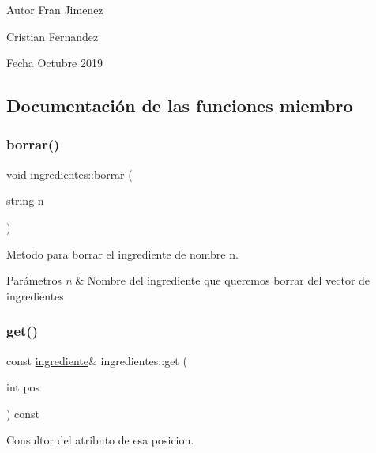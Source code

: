 \begin{DoxyAuthor}{Autor}
Fran Jimenez 

Cristian Fernandez 
\end{DoxyAuthor}
\begin{DoxyDate}{Fecha}
Octubre 2019 
\end{DoxyDate}


\subsection{Documentación de las funciones miembro}
\mbox{\label{classingredientes_a71bde8efdf96c22f0f27ab9cc6e50466}} 
\subsubsection{\texorpdfstring{borrar()}{borrar()}}
{\footnotesize\ttfamily void ingredientes\+::borrar (\begin{DoxyParamCaption}\item[{string}]{n }\end{DoxyParamCaption})}



Metodo para borrar el ingrediente de nombre n. 


\begin{DoxyParams}{Parámetros}
{\em n} & Nombre del ingrediente que queremos borrar del vector de ingredientes \\
\hline
\end{DoxyParams}
\mbox{\label{classingredientes_a2d4257359160b39365b1aac2ec6a1166}} 
\subsubsection{\texorpdfstring{get()}{get()}\hspace{0.1cm}{\footnotesize\ttfamily [1/2]}}
{\footnotesize\ttfamily const \hyperlink{classingrediente}{ingrediente}\& ingredientes\+::get (\begin{DoxyParamCaption}\item[{int}]{pos }\end{DoxyParamCaption}) const}



Consultor del atributo de esa posicion. 


